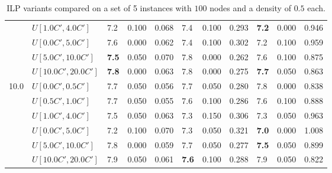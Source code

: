 \begin{table}[h]
{\begin{tabular}{|l|l||l|l|l||l|l|l||l|l|l|}
       & $U[1.0C',4.0C']$ & 7.2 & 0.100 & 0.068 & 7.4 & 0.100 & 0.293 & \textbf{7.2} & 0.000 & 0.946 \\
       & $U[0.0C',5.0C']$ & 7.6 & 0.000 & 0.062 & 7.4 & 0.100 & 0.302 & 7.2 & 0.100 & 0.959 \\
       & $U[5.0C',10.0C']$ & \textbf{7.5} & 0.050 & 0.070 & 7.8 & 0.000 & 0.262 & 7.6 & 0.100 & 0.875 \\
       & $U[10.0C',20.0C']$ & \textbf{7.8} & 0.000 & 0.063 & 7.8 & 0.000 & 0.275 & \textbf{7.7} & 0.050 & 0.863 \\
      \hline\hline
      \multirow{6}{*}{10.0} & $U[0.0C',0.5C']$ & 7.7 & 0.050 & 0.056 & 7.7 & 0.050 & 0.280 & 7.8 & 0.000 & 0.838 \\
       & $U[0.5C',1.0C']$ & 7.7 & 0.050 & 0.055 & 7.6 & 0.100 & 0.286 & 7.6 & 0.100 & 0.888 \\
       & $U[1.0C',4.0C']$ & 7.5 & 0.050 & 0.063 & 7.3 & 0.150 & 0.306 & 7.3 & 0.050 & 0.963 \\
       & $U[0.0C',5.0C']$ & 7.2 & 0.100 & 0.070 & 7.3 & 0.050 & 0.321 & \textbf{7.0} & 0.000 & 1.008 \\
       & $U[5.0C',10.0C']$ & 7.8 & 0.000 & 0.059 & 7.7 & 0.050 & 0.277 & \textbf{7.5} & 0.050 & 0.899 \\
       & $U[10.0C',20.0C']$ & 7.9 & 0.050 & 0.061 & \textbf{7.6} & 0.100 & 0.288 & 7.9 & 0.050 & 0.822 \\
      \hline
      \end{tabular}
      }
      \caption{ILP variants compared on a set of 5 instances with $100$ nodes and a density of $0.5$ each.}
      \label{tab:pcpn100RecoloredTT}\end{table}


